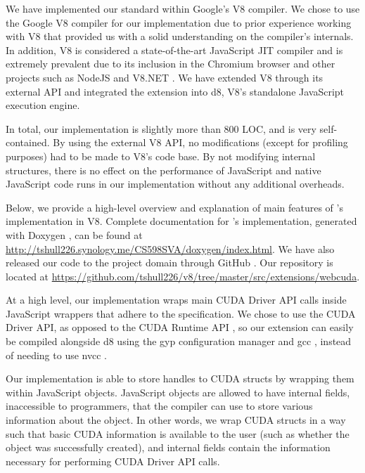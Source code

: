 
We have implemented our \name standard within Google's V8 \cite{V8website}
compiler.   We chose to use the Google V8  compiler for our implementation due
to prior experience working with V8 that  provided us with a solid
understanding on the compiler's internals. In addition, V8 is considered
a state-of-the-art JavaScript JIT compiler and is extremely prevalent due to its
inclusion in the Chromium browser \cite{chromium} and other projects such as
NodeJS \cite{nodeJS} and V8.NET \cite{V8.NET}. We have extended V8 through its
external API and integrated the extension into d8, V8's standalone JavaScript
execution engine. 

In total, our implementation is slightly more than 800 LOC, and is very
self-contained. By using the external V8 API, no modifications (except for
profiling purposes) had to be made to V8's code base. By not modifying internal
structures, there is no effect on the performance of JavaScript and native
JavaScript code runs in our implementation without any additional overheads.

Below, we provide a high-level overview and explanation of main features of
\namens's implementation in V8.  Complete documentation for \namens's implementation,
generated with Doxygen \cite{doxygen}, can be found at
\url{http://tshull226.synology.me/CS598SVA/doxygen/index.html}. We
have also released our code to the project domain through GitHub \cite{github}.
Our repository is located at
\url{https://github.com/tshull226/v8/tree/master/src/extensions/webcuda}.

At a high level, our implementation wraps main CUDA Driver API \cite{cudaAPI}
calls inside JavaScript wrappers that adhere to the \name specification. We
chose to use the CUDA Driver API, as opposed to the CUDA Runtime API
\cite{cudaRuntimeAPI}, so our extension can easily be compiled alongside d8
using the gyp \cite{gyp} configuration manager and gcc \cite{gcc}, instead of
needing to use nvcc \cite{nvcc}.

Our implementation is able to store handles to CUDA structs by wrapping them
within JavaScript objects. JavaScript objects are allowed to have internal
fields, inaccessible to programmers, that the compiler can use to store various
information about the object. In other words, we wrap CUDA structs in a way such that
basic CUDA information is available to the user (such as whether the object was
successfully created), and internal fields contain the information
necessary for performing CUDA Driver API calls.

